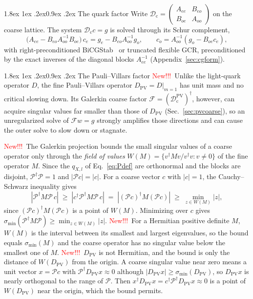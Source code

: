 \documentclass[11pt,a4paper]{article}
\makeatletter
\newif\ifshownew \shownewtrue
\DeclareRobustCommand\New{\ifshownew\textcolor{red}{New!!!}\ \else\ignorespaces\fi}
\renewcommand\subsubsection{\@startsection{subsubsection}{3}{\z@}%
  {1.8ex \@plus 1ex \@minus .2ex}{0.9ex \@plus .2ex}%
  {\centering\normalfont\small\bfseries\itshape}}
\numberwithin{equation}{section}
\newcommand{\dg}{^{\dagger}}
\newcommand{\Dpv}{D_{\mathrm{PV}}}
\newcommand{\Pro}{\mathcal P}
\newcommand{\Dc}{\mathcal D_{\mathrm c}}
\newcommand{\Dcpv}{\mathcal D_{\mathrm c}^{\mathrm{PV}}}
\newif\ifresults
\makeatother
\begin{document}
\subsubsection{The quark factor}
Write $\Dc=\begin{pmatrix}A_{ee}&B_{eo}\\ B_{oe}&A_{oo}\end{pmatrix}$ on the
coarse lattice. The system $\Dc c=g$ is solved through its Schur complement,
\begin{equation}
\big(A_{ee}-B_{eo}A_{oo}^{-1}B_{oe}\big)\,c_e=g_e-B_{eo}A_{oo}^{-1}g_o,\qquad
c_o=A_{oo}^{-1}(g_o-B_{oe}c_e),
\label{eq:coarseeo}
\end{equation}
with right-preconditioned BiCGStab~\cite{vanderVorst,SleijpenvdVomega} or truncated flexible GCR,
preconditioned by the exact inverses of the diagonal blocks $A_{ee}^{-1}$
(Appendix~\ref{sec:cgform}).

\subsubsection{The Pauli--Villars factor}
\New Unlike the light-quark operator $D$, the fine Pauli--Villars operator $\Dpv=D|_{m=1}$ has
unit mass and no critical slowing down. Its Galerkin coarse factor $\mathcal F=(\Dcpv)\dg$,
however, can acquire singular values far smaller than those of $\Dpv$ (Sec.~\ref{sec:pvcoarse}),
so an unregularized solve of $\mathcal Fw=g$ strongly amplifies those directions and can cause the
outer solve to slow down or stagnate.

\New The Galerkin projection bounds the small singular values of a coarse operator only through
the \emph{field of values} $W(M)=\{v\dg Mv/v\dg v : v\neq0\}$ of the fine operator $M$. Since the
$q_{X,l}$ of Eq.~\eqref{eq:Pdef} are orthonormal and the blocks are disjoint, $\Pro\dg\Pro=1$ and
$|\Pro c|=|c|$. For a coarse vector $c$ with $|c|=1$, the Cauchy--Schwarz inequality gives
\begin{equation*}
|\Pro\dg M\Pro\,c|\;\ge\;|c\dg\Pro\dg M\Pro\,c|\;=\;|(\Pro c)\dg M(\Pro c)|\;\ge\;
\min_{z\in W(M)}|z|,
\end{equation*}
since $(\Pro c)\dg M(\Pro c)$ is a point of $W(M)$. Minimizing over $c$ gives
$\sigma_{\min}(\Pro\dg M\Pro)\ge\min_{z\in W(M)}|z|$. \New For a Hermitian positive definite $M$,
$W(M)$ is the interval between its smallest and largest eigenvalues, so the bound equals
$\sigma_{\min}(M)$ and the coarse operator has no singular value below the smallest one of $M$.
\New $\Dpv$ is not Hermitian, and the bound is only the distance of $W(\Dpv)$ from the origin. A
coarse singular value near zero means a unit vector $x=\Pro c$ with $\Pro\dg\Dpv x\approx0$ although
$|\Dpv x|\ge\sigma_{\min}(\Dpv)$, so $\Dpv x$ is nearly orthogonal to the range of $\Pro$. Then
$x\dg\Dpv x=c\dg\Pro\dg\Dpv x\approx0$ is a point of $W(\Dpv)$ near the origin, which the bound
permits.\ifresults{} Table~\ref{tab:pvsv} shows that this occurs with smeared links, where the coarse
smallest singular value falls far below that of $\Dpv$.\fi
\end{document}
